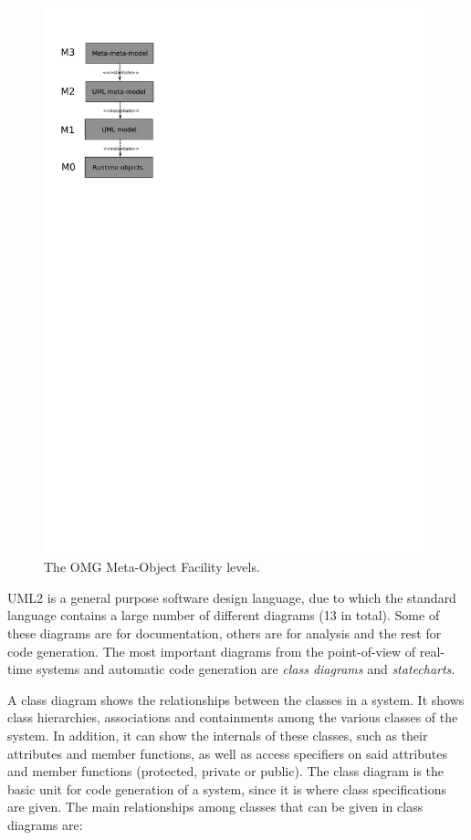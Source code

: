 \begin{figure}
\centering
\includegraphics[scale=0.75]{figs/mof}
\caption{The OMG Meta-Object Facility levels.}
\label{fig:mof}
\end{figure}

UML2 is a general purpose software design language, due to which the
standard language contains a large number of different diagrams (13 in
total). Some of these diagrams are for documentation, others are for
analysis and the rest for code generation. The most important diagrams
from the point-of-view of real-time systems and automatic code
generation are \emph{class diagrams} and \emph{statecharts}.

A class diagram shows the relationships between the classes in a
system. It shows class hierarchies, associations and containments
among the various classes of the system. In addition, it can show the
internals of these classes, such as their attributes and member
functions, as well as access specifiers on said attributes and member
functions (protected, private or public). The class diagram is the
basic unit for code generation of a system, since it is where class
specifications are given. The main relationships among classes that
can be given in class diagrams are:

